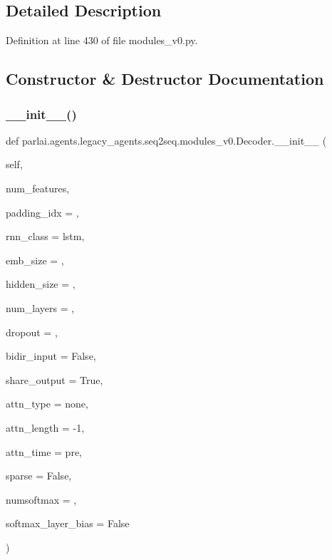 

\subsection{Detailed Description}


Definition at line 430 of file modules\+\_\+v0.\+py.



\subsection{Constructor \& Destructor Documentation}
\mbox{\label{classparlai_1_1agents_1_1legacy__agents_1_1seq2seq_1_1modules__v0_1_1Decoder_a96b70aa2702cbca1322750098d236659}} 
\subsubsection{\texorpdfstring{\+\_\+\+\_\+init\+\_\+\+\_\+()}{\_\_init\_\_()}}
{\footnotesize\ttfamily def parlai.\+agents.\+legacy\+\_\+agents.\+seq2seq.\+modules\+\_\+v0.\+Decoder.\+\_\+\+\_\+init\+\_\+\+\_\+ (\begin{DoxyParamCaption}\item[{}]{self,  }\item[{}]{num\+\_\+features,  }\item[{}]{padding\+\_\+idx = {},  }\item[{}]{rnn\+\_\+class = {\ttfamily \textquotesingle{}lstm\textquotesingle{}},  }\item[{}]{emb\+\_\+size = {},  }\item[{}]{hidden\+\_\+size = {},  }\item[{}]{num\+\_\+layers = {},  }\item[{}]{dropout = {},  }\item[{}]{bidir\+\_\+input = {\ttfamily False},  }\item[{}]{share\+\_\+output = {\ttfamily True},  }\item[{}]{attn\+\_\+type = {\ttfamily \textquotesingle{}none\textquotesingle{}},  }\item[{}]{attn\+\_\+length = {\ttfamily -\/1},  }\item[{}]{attn\+\_\+time = {\ttfamily \textquotesingle{}pre\textquotesingle{}},  }\item[{}]{sparse = {\ttfamily False},  }\item[{}]{numsoftmax = {},  }\item[{}]{softmax\+\_\+layer\+\_\+bias = {\ttfamily False} }\end{DoxyParamCaption})}



